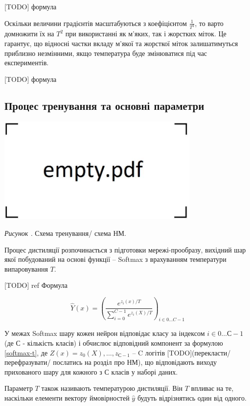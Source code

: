 \documentclass[14pt,a4paper]{extarticle}
\newcounter{e}
\newcounter{pic}
\newcommand{\pic}[1]{\refstepcounter{pic} \vspace{-0.3cm}\textit{Рисунок \arabic{pic}\label{#1}.}}
\numberwithin{equation}{section}
\numberwithin{figure}{section}
\begin{document}
 [TODO] формула
 
 Оскільки величини градієнтів масштабуються з коефіцієнтом $\frac{1}{T^2}$, то варто домножити їх на $T^2$ при використанні як м'яких, так і жорстких міток. Це гарантує, що відносні частки вкладу м'якої та жорсткої міток залишатимуться приблизно незмінними, якщо температура буде змінюватися під час експериментів.
 
 [TODO] формула
 
 \subsection{Процес тренування та основні параметри} 
 
 \begin{center}
 	\includegraphics[width=10cm]{../images/empty.pdf}
 \end{center}
 \begin{center}
 	\pic{distilation} Схема тренування/ схема НМ.
 \end{center}
 
 Процес дистиляції розпочинається з підготовки мережі-прообразу, вихідний шар якої побудований на основі функції -- Softmax з врахуванням температури випаровування $T$.
 
 [TODO] ref Формула
  
 \begin{equation}
 \label{softmax-t}
 \hat{Y}(x)=\left(\frac{e^{z_{i}(x) / T}}{\sum\limits_{i=0}^{C-1} e^{z_{i}(X) / T}}\right)_{i \in 0 \dots C-1}
 \end{equation}

 У межах Softmax шару кожен нейрон відповідає класу за індексом $i \in 0 \dots С-1$ (де С - кількість класів) і обчислює відповідний компонент за формулою \ref{softmax-t}, де $Z(x) = z_0(X), \dots , z_{С-1}$ -- C логітів [TODO](перекласти/ перефразувати/ послатись на розділ про НМ), що відповідають виходу прихованого шару для кожного з С класів у наборі даних.
 
 Параметр $T$ також називають температурою дистиляції. Він $T$ впливає на те, наскільки елементи вектору ймовірностей $\hat{y}$ будуть відрізнятись один від одного. 
 
\end{document}
